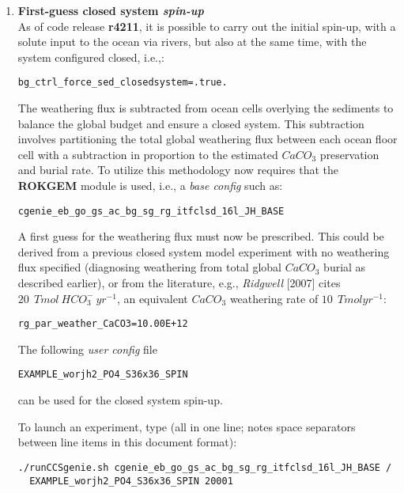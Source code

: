 \documentclass[11pt,fleqn]{book} %
\begin{document}
\begin{enumerate}

\vspace{1mm}
\item \textbf{First-guess closed system \textit{spin-up}}
\\As of code release \textbf{r4211}, it is possible to carry out the initial spin-up, with a solute input to the ocean via rivers, but also at the same time, with the system configured closed, i.e.,:
\vspace{-1mm}\begin{verbatim}bg_ctrl_force_sed_closedsystem=.true.\end{verbatim}\vspace{-1mm}
The weathering flux is subtracted from ocean cells overlying the sediments to balance the global budget and ensure a closed system. This subtraction involves partitioning the total global weathering flux between each ocean floor cell with a subtraction in proportion to the estimated \(CaCO_{3}\) preservation and burial rate. To utilize this methodology now requires that the \textbf{ROKGEM} module is used, i.e., a \textit{base config} such as:
\vspace{-1mm}\begin{verbatim}cgenie_eb_go_gs_ac_bg_sg_rg_itfclsd_16l_JH_BASE\end{verbatim}\vspace{-1mm}
A first guess for the weathering flux must now be prescribed. This could be derived from a previous closed system model experiment with no weathering flux specified (diagnosing weathering from total global \(CaCO_{3}\) burial as described earlier), or from the literature, e.g., \textit{Ridgwell} [2007] cites \(20\:\ Tmol \:HCO^{-}_{3} \:yr^{-1}\), an equivalent \(CaCO_{3}\) weathering rate of \(10\:\ Tmol yr^{-1}\):
\vspace{-1mm}\begin{verbatim}rg_par_weather_CaCO3=10.00E+12\end{verbatim}\vspace{-1mm}

The following \textit{user config} file
\vspace{-1mm}\begin{verbatim}EXAMPLE_worjh2_PO4_S36x36_SPIN\end{verbatim}\vspace{-1mm}
can be used for the closed system spin-up.

\noindent To launch an experiment, type (all in one line; notes space separators between line items in this document format):
\vspace{-1mm}\begin{verbatim}
./runCCSgenie.sh cgenie_eb_go_gs_ac_bg_sg_rg_itfclsd_16l_JH_BASE /
  EXAMPLE_worjh2_PO4_S36x36_SPIN 20001
\end{verbatim}\vspace{-1mm}


\end{enumerate}
\end{document}
